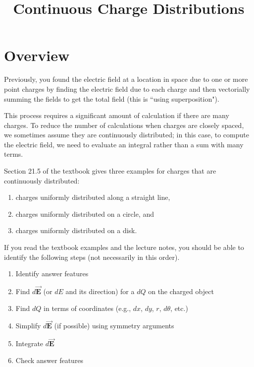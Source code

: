\documentclass{article}
\title{Continuous Charge Distributions}
\newcommand{\bfvec}[1]{\vec{\mathbf{#1}}}
\begin{document}
\section{Overview}

Previously, you found the electric field at a location in space due to one or more point charges by finding the electric field due to each charge and then vectorially summing the fields to get the total field (this is ``using superposition").

This process requires a significant amount of calculation if there are many charges. To reduce the number of calculations when charges are closely spaced, we sometimes assume they are continuously distributed; in this case, to compute the electric field, we need to evaluate an integral rather than a sum with many terms.

Section 21.5 of the textbook gives three examples for charges that are continuously distributed:

\begin{enumerate}

  \item charges uniformly distributed along a straight line,

  \item charges uniformly distributed on a circle, and

  \item charges uniformly distributed on a disk.

\end{enumerate}

If you read the textbook examples and the lecture notes, you should be able to identify the following steps (not necessarily in this order).

\begin{enumerate}

  \item Identify answer features

  \item Find $d\bfvec{E}$ (or $dE$ and its direction) for a $dQ$ on the charged object

  \item Find $dQ$ in terms of coordinates (e.g., $dx$, $dy$, $r$, $d\theta$, etc.)

  \item Simplify $d\bfvec{E}$ (if possible) using symmetry arguments

  \item Integrate $d\bfvec{E}$

  \item Check answer features

\end{enumerate}
\end{document}
